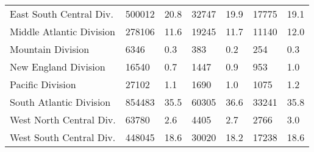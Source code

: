 \begin{longtable}{lllllll}
East South Central Div. & 500012 & 20.8 & 32747 & 19.9 & 17775 & 19.1 \\ 
Middle Atlantic Division & 278106 & 11.6 & 19245 & 11.7 & 11140 & 12.0 \\ 
Mountain Division & 6346 & 0.3 & 383 & 0.2 & 254 & 0.3 \\ 
New England Division & 16540 & 0.7 & 1447 & 0.9 & 953 & 1.0 \\ 
Pacific Division & 27102 & 1.1 & 1690 & 1.0 & 1075 & 1.2 \\ 
South Atlantic Division & 854483 & 35.5 & 60305 & 36.6 & 33241 & 35.8 \\ 
West North Central Div. & 63780 & 2.6 & 4405 & 2.7 & 2766 & 3.0 \\ 
West South Central Div. & 448045 & 18.6 & 30020 & 18.2 & 17238 & 18.6 \\ 
\bottomrule
\end{longtable}

